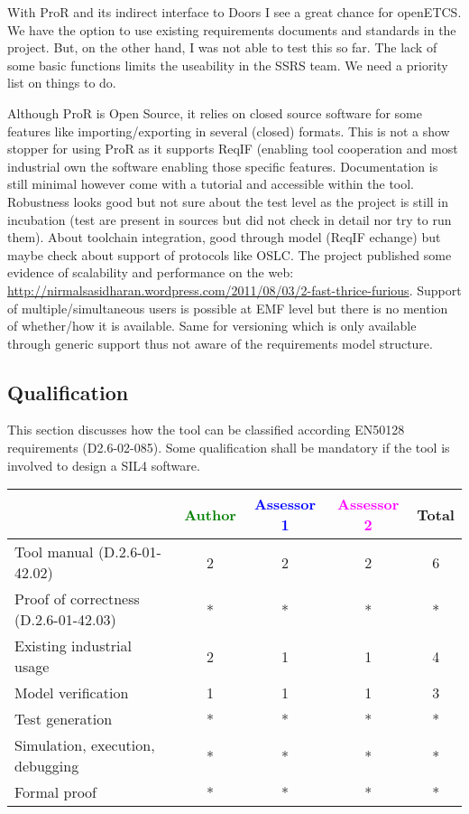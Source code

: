 \begin{assessor1}
With ProR and its indirect interface to Doors I see a great chance for openETCS. We have the option to use existing requirements documents and standards in the project. But, on the other hand, I was not able to test this so far. The lack of some basic functions limits the useability in the SSRS team. We need a priority list on things to do.
\end{assessor1}

\begin{assessor2}
Although ProR is Open Source, it relies on closed source software for some features like importing/exporting in several (closed) formats. This is not a show stopper for using ProR as it supports ReqIF (enabling tool cooperation and most industrial own the software enabling those specific features. Documentation is still minimal however come with a tutorial and accessible within the tool. Robustness looks good but not sure about the test level as the project is still in incubation (test are present in sources but did not check in detail nor try to run them). About toolchain integration, good through model (ReqIF echange) but maybe check about support of protocols like OSLC. The project published some evidence of scalability and performance on the web: \url{http://nirmalsasidharan.wordpress.com/2011/08/03/2-fast-thrice-furious}. Support of multiple/simultaneous users is possible at EMF level but there is no mention of whether/how it is available. Same for versioning which is only available through generic support thus not aware of the requirements model structure.
\end{assessor2}

\subsection{Qualification}

This section discusses how the tool can be classified according EN50128 requirements (D2.6-02-085). Some qualification shall be mandatory  if the tool is involved to design a SIL4 software.


\begin{tabular}{|l | c | c | c | c|}
\hline
& \textcolor{green}{Author} & \textcolor{blue}{Assessor 1} & \textcolor{magenta}{Assessor 2} & Total \\
\hline
Tool manual (D.2.6-01-42.02) & 2 & 2 & 2 &  6 \\
\hline
Proof of correctness (D.2.6-01-42.03) & * & * & * & * \\
\hline
Existing industrial  usage  & 2 & 1 & 1 & 4 \\
\hline
Model verification & 1 & 1 & 1 & 3 \\
\hline
Test generation & * & * & * & * \\
\hline
Simulation, execution, debugging & * & * & * & * \\
\hline
Formal proof & * & * & * & * \\
\hline
\end{tabular}

